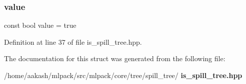 \subsubsection{value}
{\footnotesize\ttfamily const bool value = true\hspace{0.3cm}{\ttfamily [static]}}



Definition at line 37 of file is\+\_\+spill\+\_\+tree.\+hpp.



The documentation for this struct was generated from the following file\+:\begin{DoxyCompactItemize}
\item 
/home/aakash/mlpack/src/mlpack/core/tree/spill\+\_\+tree/\textbf{ is\+\_\+spill\+\_\+tree.\+hpp}\end{DoxyCompactItemize}
